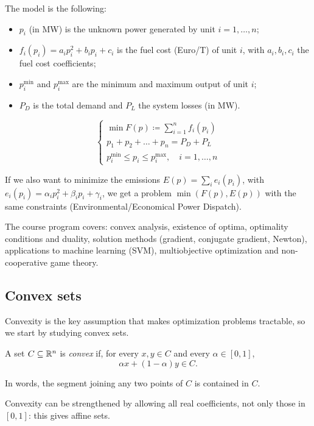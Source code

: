 The model is the following:
\begin{itemize}
    \item $p_i$ (in MW) is the unknown power generated by unit $i = 1, \dots, n$;
    \item $f_i(p_i) = a_i p_i^2 + b_i p_i + c_i$ is the fuel cost (Euro/T) of unit $i$, with $a_i, b_i, c_i$ the fuel cost coefficients;
    \item $p_i^{\min}$ and $p_i^{\max}$ are the minimum and maximum output of unit $i$;
    \item $P_D$ is the total demand and $P_L$ the system losses (in MW).
\end{itemize}
\[
    \begin{cases}
        \min F(p) \coloneqq \sum_{i=1}^{n} f_i(p_i)\\
        p_1 + p_2 + \dots + p_n = P_D + P_L\\
        p_i^{\min} \le p_i \le p_i^{\max}, \quad i = 1, \dots, n
    \end{cases}
\]

\begin{remark}
If we also want to minimize the emissions $E(p) = \sum_i e_i(p_i)$, with $e_i(p_i) = \alpha_i p_i^2 + \beta_i p_i + \gamma_i$, we get a  problem $\min (F(p), E(p))$ with the same constraints (Environmental/Economical Power Dispatch).
\end{remark}

The course program covers: convex analysis, existence of optima, optimality conditions and duality, solution methods (gradient, conjugate gradient, Newton), applications to machine learning (SVM), multiobjective optimization and non-cooperative game theory.

\pagebreak
\subsection{Convex sets}

Convexity is the key assumption that makes optimization problems tractable, so we start by studying convex sets.

\begin{definition}
A set $C \subseteq \mathbb{R}^n$ is \emph{convex} if, for every $x, y \in C$ and every $\alpha \in [0,1]$,
\[
  \alpha x + (1-\alpha) y \in C.
\]
\end{definition}

In words, the segment joining any two points of $C$ is contained in $C$.

Convexity can be strengthened by allowing all real coefficients, not only those in $[0,1]$: this gives affine sets.

